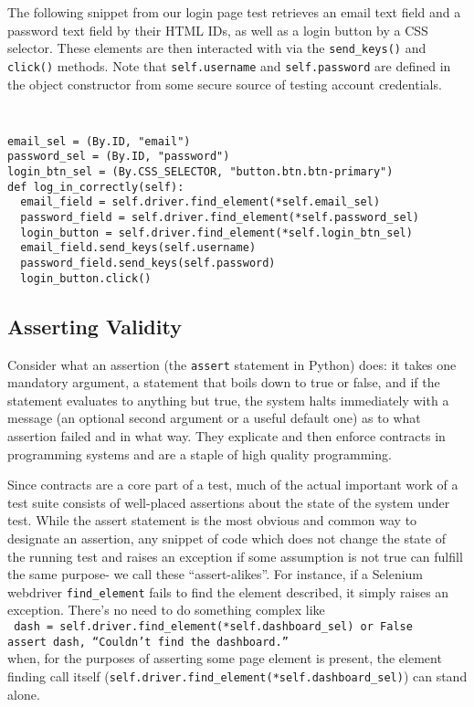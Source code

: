 The following snippet from our login page test retrieves an email text field and a password text field by their HTML IDs, as well as a login button by a CSS selector. These elements are then interacted with via the \texttt{send\_keys()} and \texttt{click()} methods. Note that \texttt{self.username} and \texttt{self.password} are defined in the object constructor from some secure source of testing account credentials.

{\tt
\begin{verbatim}
email_sel = (By.ID, "email")
password_sel = (By.ID, "password")
login_btn_sel = (By.CSS_SELECTOR, "button.btn.btn-primary")
def log_in_correctly(self):
  email_field = self.driver.find_element(*self.email_sel)
  password_field = self.driver.find_element(*self.password_sel)
  login_button = self.driver.find_element(*self.login_btn_sel)
  email_field.send_keys(self.username)
  password_field.send_keys(self.password)
  login_button.click()
\end{verbatim}
}

\subsection{Asserting Validity}
Consider what an assertion (the \texttt{assert} statement in Python) does: it takes one mandatory argument, a statement that boils down to true or false, and if the statement evaluates to anything but true, the system halts immediately with a message (an optional second argument or a useful default one) as to what assertion failed and in what way. They explicate and then enforce contracts in programming systems and are a staple of high quality programming.

Since contracts are a core part of a test, much of the actual important work of a test suite consists of well-placed assertions about the state of the system under test. While the assert statement is the most obvious and common way to designate an assertion, any snippet of code which does not change the state of the running test and raises an exception if some assumption is not true can fulfill the same purpose- we call these ``assert-alikes''. For instance, if a Selenium webdriver \texttt{find\_element} fails to find the element described, it simply raises an exception. There's no need to do something complex like\\
\texttt{
 dash = self.driver.find\_element(*self.dashboard\_sel) or False\\
 assert dash, ``Couldn't find the dashboard.''\\
}
when, for the purposes of asserting some page element is present, the element finding call itself (\texttt{self.driver.find\_element(*self.dashboard\_sel)}) can stand alone.


